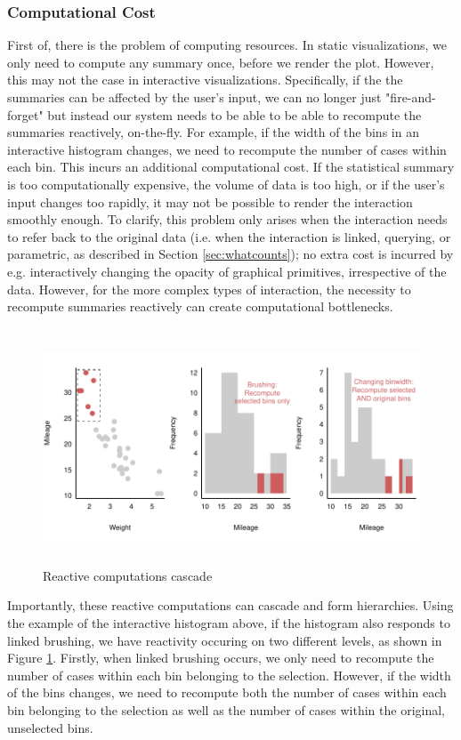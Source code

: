 \documentclass[12pt,a4paper]{article}
\begin{document}
\subsubsection{Computational Cost}

First of, there is the problem of computing resources. In static visualizations, we only need to compute any summary once, before we render the plot. However, this may not the case in interactive visualizations. Specifically, if the the summaries can be affected by the user's input, we can no longer just "fire-and-forget" but instead our system needs to be able to be able to recompute the summaries reactively, on-the-fly. For example, if the width of the bins in an interactive histogram changes, we need to recompute the number of cases within each bin. This incurs an additional computational cost. If the statistical summary is too computationally expensive, the volume of data is too high, or if the user's input changes too rapidly, it may not be possible to render the interaction smoothly enough. To clarify, this problem only arises when the interaction needs to refer back to the original data (i.e. when the interaction is linked, querying, or parametric, as described in Section \ref{sec:whatcounts}); no extra cost is incurred by e.g. interactively changing the opacity of graphical primitives, irrespective of the data. However, for the more complex types of interaction, the necessity to recompute summaries reactively can create computational bottlenecks.   

\begin{figure}[H]
\centering
\includegraphics[height=70mm]{./figure03.pdf}
\caption{Reactive computations cascade}
\label{fig:reactivecascade}
\end{figure}

Importantly, these reactive computations can cascade and form hierarchies. Using the example of the interactive histogram above, if the histogram also responds to linked brushing, we have reactivity occuring on two different levels, as shown in Figure \ref{fig:reactivecascade}. Firstly, when linked brushing occurs, we only need to recompute the number of cases within each bin belonging to the selection. However, if the width of the bins changes, we need to recompute both the number of cases within each bin belonging to the selection as well as the number of cases within the original, unselected bins.    
\end{document}
